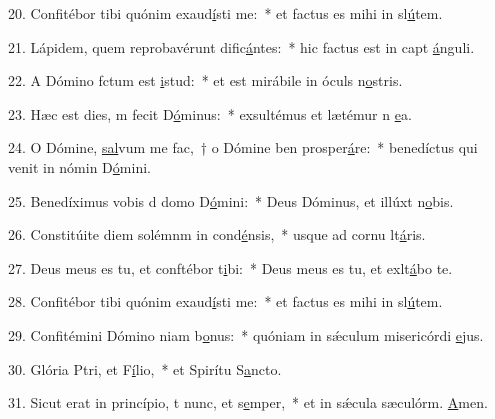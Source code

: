 20. Confitébor tibi quónim exaud\uline{í}sti me:~* et factus es mihi in sl\uline{ú}tem.\par 
21. Lápidem, quem reprobavérunt dific\uline{á}ntes:~* hic factus est in capt \uline{á}nguli.\par 
22. A Dómino fctum est \uline{i}stud:~* et est mirábile in óculs n\uline{o}stris.\par 
23. Hæc est dies, m fecit D\uline{ó}minus:~* exsultémus et lætémur n \uline{e}a.\par 
24. O Dómine, \uline{sal}vum me fac,~† o Dómine ben prosper\uline{á}re:~* benedíctus qui venit in nómin D\uline{ó}mini.\par 
25. Benedíximus vobis d domo D\uline{ó}mini:~* Deus Dóminus, et illúxt n\uline{o}bis.\par 
26. Constitúite diem solémnm in cond\uline{é}nsis,~* usque ad cornu lt\uline{á}ris.\par 
27. Deus meus es tu, et conftébor t\uline{i}bi:~* Deus meus es tu, et exlt\uline{á}bo te.\par 
28. Confitébor tibi quónim exaud\uline{í}sti me:~* et factus es mihi in sl\uline{ú}tem.\par 
29. Confitémini Dómino niam b\uline{o}nus:~* quóniam in sǽculum misericórdi \uline{e}jus.\par 
30. Glória Ptri, et F\uline{í}lio,~* et Spirítu S\uline{a}ncto.\par 
31. Sicut erat in princípio, t nunc, et s\uline{e}mper,~* et in sǽcula sæculórm. \uline{A}men.\par 
